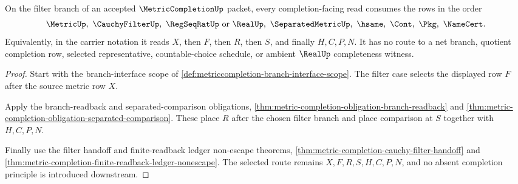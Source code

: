 \begin{theorem}
\label{thm:metriccompletion-filter-branch-scope}
On the filter branch of an accepted $\MetricCompletionUp$ packet, every completion-facing read consumes the rows in the order
$$
\MetricUp,\ \CauchyFilterUp,\ \RegSeqRatUp\hbox{ or }\RealUp,\ \SeparatedMetricUp,\ \hsame,\ \Cont,\ \Pkg,\ \NameCert .
$$
Equivalently, in the carrier notation it reads $X$, then $F$, then $R$, then $S$, and finally $H,C,P,N$. It has no route to a net branch, quotient completion row, selected representative, countable-choice schedule, or ambient $\RealUp$ completeness witness.
\end{theorem}
\begin{proof}
Start with the branch-interface scope of \autoref{def:metriccompletion-branch-interface-scope}. The filter case selects the displayed row $F$ after the source metric row $X$.

Apply the branch-readback and separated-comparison obligations, \autoref{thm:metric-completion-obligation-branch-readback} and \autoref{thm:metric-completion-obligation-separated-comparison}. These place $R$ after the chosen filter branch and place comparison at $S$ together with $H,C,P,N$.

Finally use the filter handoff and finite-readback ledger non-escape theorems, \autoref{thm:metric-completion-cauchy-filter-handoff} and \autoref{thm:metric-completion-finite-readback-ledger-nonescape}. The selected route remains $X,F,R,S,H,C,P,N$, and no absent completion principle is introduced downstream.
\end{proof}

